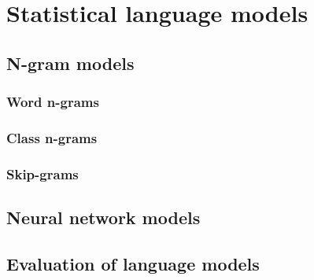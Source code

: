 \chapter{Statistical language models}
\label{chapter:lm}

\section{N-gram models}
\subsection{Word n-grams}
\subsection{Class n-grams}
\subsection{Skip-grams}

\section{Neural network models}

\section{Evaluation of language models}


